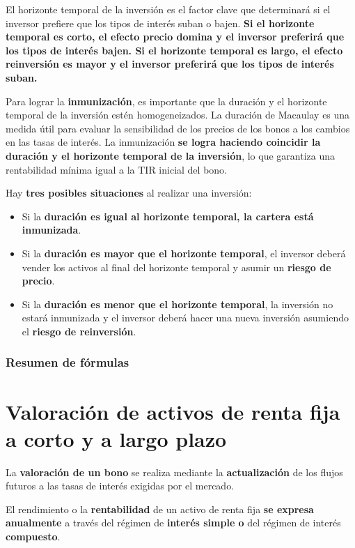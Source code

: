 \documentclass[
  letterpaper,
  DIV=11,
  numbers=noendperiod]{scrreprt}
\begin{document}
\begin{tcolorbox}
El horizonte temporal de la inversión es el factor clave que determinará
si el inversor prefiere que los tipos de interés suban o bajen.
\textbf{Si el horizonte temporal es corto, el efecto precio domina y el
inversor preferirá que los tipos de interés bajen. Si el horizonte
temporal es largo, el efecto reinversión es mayor y el inversor
preferirá que los tipos de interés suban.}

Para lograr la \textbf{inmunización}, es importante que la duración y el
horizonte temporal de la inversión estén homogeneizados. La duración de
Macaulay es una medida útil para evaluar la sensibilidad de los precios
de los bonos a los cambios en las tasas de interés. La inmunización
\textbf{se logra haciendo coincidir la duración y el horizonte temporal
de la inversión}, lo que garantiza una rentabilidad mínima igual a la
TIR inicial del bono.

Hay \textbf{tres posibles situaciones} al realizar una inversión:

\begin{itemize}
\item
  Si la \textbf{duración es igual al horizonte temporal, la cartera está
  inmunizada}.
\item
  Si la \textbf{duración es mayor que el horizonte temporal}, el
  inversor deberá vender los activos al final del horizonte temporal y
  asumir un \textbf{riesgo de precio}.
\item
  Si la \textbf{duración es menor que el horizonte temporal}, la
  inversión no estará inmunizada y el inversor deberá hacer una nueva
  inversión asumiendo el \textbf{riesgo de reinversión}.
\end{itemize}

\subsubsection{Resumen de fórmulas}\label{resumen-de-fuxf3rmulas}

\section{Valoración de activos de renta fija a corto y a largo
plazo}\label{valoraciuxf3n-de-activos-de-renta-fija-a-corto-y-a-largo-plazo}

La \textbf{valoración de un bono} se realiza mediante la
\textbf{actualización} de los flujos futuros a las tasas de interés
exigidas por el mercado.

El rendimiento o la \textbf{rentabilidad} de un activo de renta fija
\textbf{se expresa anualmente} a través del régimen de \textbf{interés
simple o} del régimen de interés \textbf{compuesto}.


\end{tcolorbox}
\end{document}
